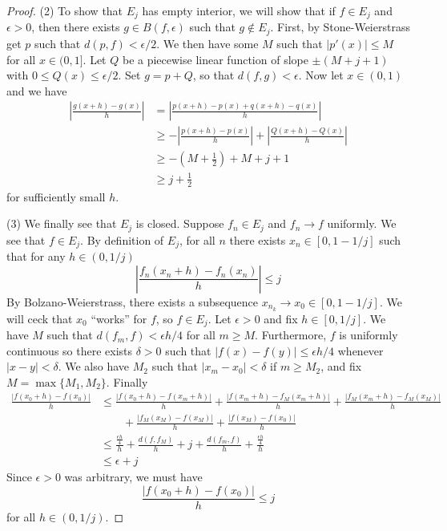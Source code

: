 \documentclass[11pt, a4paper]{memoir}
\theoremstyle{change}
\theoremstyle{plain}
\theoremstyle{nonumberplain}
\newtheorem{proof}{Proof}
\numberwithin{equation}{section}
\begin{document}
\begin{proof}
    (2) To show that $E_j$ has empty interior, we will show that if $f\in E_j$ and $\epsilon>0$, then there exists $g\in B(f,\epsilon)$ such that $g\notin E_j$.
    First, by Stone-Weierstrass get $p$ such that $d(p,f)<\epsilon/2$.
    We then have some $M$ such that $|p'(x)|\leq M$ for all $x\in(0,1]$.
    Let $Q$ be a piecewise linear function of slope $\pm(M+j+1)$ with $0\leq Q(x)\leq\epsilon/2$.
    Set $g=p+Q$, so that $d(f,g)<\epsilon$.
    Now let $x\in(0,1)$ and we have
    \begin{align*}
        \left\lvert\frac{g(x+h)-g(x)}{h}\right\rvert &= \left\lvert\frac{p(x+h)-p(x)+q(x+h)-q(x)}{h}\right\rvert\\
                                                     &\geq -\left\lvert\frac{p(x+h)-p(x)}{h}\right\rvert+\left\lvert\frac{Q(x+h)-Q(x)}{h}\right\rvert\\
                                                     &\geq -\left(M+\frac{1}{2}\right)+M+j+1\\
                                                     &\geq j+\frac{1}{2}
    \end{align*}
    for sufficiently small $h$.

    (3) We finally see that $E_j$ is closed.
    Suppose $f_n\in E_j$ and $f_n\to f$ uniformly.
    We see that $f\in E_j$.
    By definition of $E_j$, for all $n$ there exists $x_n\in[0,1-1/j]$ such that for any $h\in(0,1/j)$
    \[\left\lvert\frac{f_n(x_n+h)-f_n(x_n)}{h}\right\rvert\leq j\]
    By Bolzano-Weierstrass, there exists a subsequence $x_{n_k}\to x_0\in[0,1-1/j]$.
    We will ceck that $x_0$ ``works'' for $f$, so $f\in E_j$.
    Let $\epsilon>0$ and fix $h\in[0,1/j]$.
    We have $M$ such that $d(f_m,f)<\epsilon h/4$ for all $m\geq M$.
    Furthermore, $f$ is uniformly continuous so there exists $\delta>0$ such that $|f(x)-f(y)|\leq\epsilon h/4$ whenever $|x-y|<\delta$.
    We also have $M_2$ such that $|x_m-x_0|<\delta$ if $m\geq M_2$, and fix $M=\max\{M_1,M_2\}$.
    Finally
    \begin{align*}
        \frac{|f(x_0+h)-f(x_0)|}{h} &\leq \frac{|f(x_0+h)-f(x_m+h)|}{h}+\frac{|f(x_m+h)-f_M(x_m+h)|}{h}+\frac{|f_M(x_m+h)-f_M(x_M)|}{h}\\
                                    &\qquad+\frac{|f_M(x_M)-f(x_M)|}{h}+\frac{|f(x_M)-f(x_0)|}{h}\\
                                    &\leq \frac{\frac{\epsilon h}{4}}{h}+\frac{d(f,f_M)}{h}+j+\frac{d(f_m,f)}{h}+\frac{\frac{\epsilon h}{4}}{h}\\
                                    &\leq \epsilon+j
    \end{align*}
    Since $\epsilon>0$ was arbitrary, we must have
    \[\frac{|f(x_0+h)-f(x_0)|}{h}\leq j\]
    for all $h\in(0,1/j)$.
\end{proof}
\end{document}
